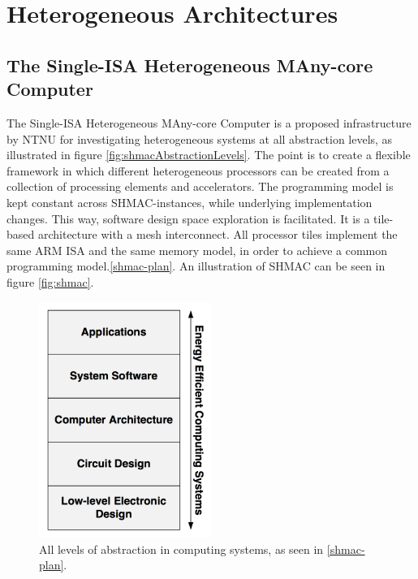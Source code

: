 
\section{Heterogeneous Architectures}
\label{sec:heterogeneous}


\subsection{The Single-ISA Heterogeneous MAny-core Computer}
\label{sec:shmac}
The Single-ISA Heterogeneous MAny-core Computer is a proposed infrastructure by NTNU for investigating heterogeneous systems at all abstraction levels, as illustrated in figure \ref{fig:shmacAbstractionLevels}.
The point is to create a flexible framework in which different heterogeneous processors can be created from a collection of processing elements and accelerators.
The programming model is kept constant across SHMAC-instances, while underlying implementation changes.
This way, software design space exploration is facilitated.
It is a tile-based architecture with a mesh interconnect.
All processor tiles implement the same ARM ISA and the same memory model, in order to achieve a common programming model.\ref{shmac-plan}.
An illustration of SHMAC can be seen in figure \ref{fig:shmac}.

\begin{figure}[htb]
    \centering
    \includegraphics[width=0.5\textwidth]{Figures/Heterogeneous/SHMACAbstractionLevels}
    \caption{All levels of abstraction in computing systems, as seen in \ref{shmac-plan}.}
    \label{fig:shmacAbstracionLevels}
\end{figure}

